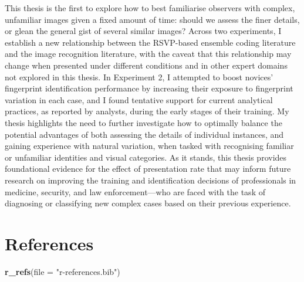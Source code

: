 \documentclass[
  english,
  man]{apa6}
\newenvironment{Shaded}{\begin{snugshade}}{\end{snugshade}}
\newcommand{\DataTypeTok}[1]{\textcolor[rgb]{0.13,0.29,0.53}{#1}}
\newcommand{\KeywordTok}[1]{\textcolor[rgb]{0.13,0.29,0.53}{\textbf{#1}}}
\newcommand{\NormalTok}[1]{#1}
\newcommand{\StringTok}[1]{\textcolor[rgb]{0.31,0.60,0.02}{#1}}
\newenvironment{cslreferences}%
  {}%
  {\par}
\begin{document}
This thesis is the first to explore how to best familiarise observers with complex, unfamiliar images given a fixed amount of time: should we assess the finer details, or glean the general gist of several similar images? Across two experiments, I establish a new relationship between the RSVP-based ensemble coding literature and the image recognition literature, with the caveat that this relationship may change when presented under different conditions and in other expert domains not explored in this thesis. In Experiment 2, I attempted to boost novices' fingerprint identification performance by increasing their exposure to fingerprint variation in each case, and I found tentative support for current analytical practices, as reported by analysts, during the early stages of their training. My thesis highlights the need to further investigate how to optimally balance the potential advantages of both assessing the details of individual instances, and gaining experience with natural variation, when tasked with recognising familiar or unfamiliar identities and visual categories. As it stands, this thesis provides foundational evidence for the effect of presentation rate that may inform future research on improving the training and identification decisions of professionals in medicine, security, and law enforcement---who are faced with the task of diagnosing or classifying new complex cases based on their previous experience.

\newpage

\hypertarget{references}{%
\section{References}\label{references}}

\begin{Shaded}
\begin{Highlighting}[]
\KeywordTok{r\_refs}\NormalTok{(}\DataTypeTok{file =} \StringTok{"r{-}references.bib"}\NormalTok{)}
\end{Highlighting}
\end{Shaded}

\begingroup
\setlength{\parindent}{-0.5in}
\setlength{\leftskip}{0.5in}

\hypertarget{refs}{}
\begin{cslreferences}
\end{cslreferences}

\endgroup
\end{document}
